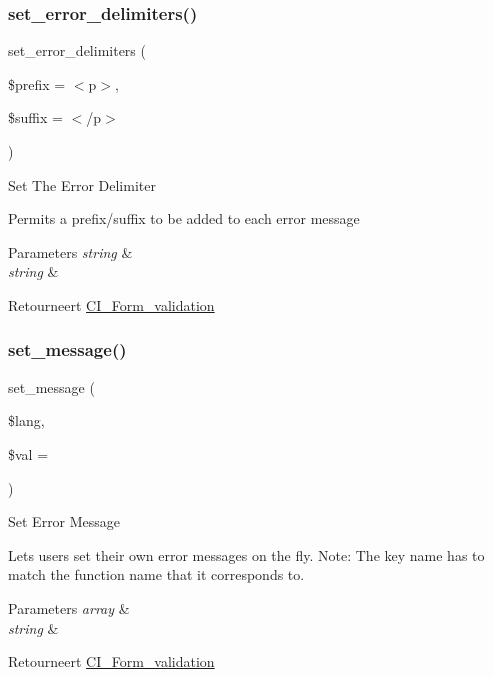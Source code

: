 \subsubsection{\texorpdfstring{set\_error\_delimiters()}{set\_error\_delimiters()}}
{\footnotesize\ttfamily set\+\_\+error\+\_\+delimiters (\begin{DoxyParamCaption}\item[{}]{\$prefix = {\ttfamily \textquotesingle{}$<$p$>$\textquotesingle{}},  }\item[{}]{\$suffix = {\ttfamily \textquotesingle{}$<$/p$>$\textquotesingle{}} }\end{DoxyParamCaption})}

Set The Error Delimiter

Permits a prefix/suffix to be added to each error message


\begin{DoxyParams}{Parameters}
{\em string} & \\
\hline
{\em string} & \\
\hline
\end{DoxyParams}
\begin{DoxyReturn}{Retourneert}
\mbox{\hyperlink{class_c_i___form__validation}{C\+I\+\_\+\+Form\+\_\+validation}} 
\end{DoxyReturn}
\mbox{\label{class_c_i___form__validation_a5a0dc4d3aef1f228155320a1d5275895}} 
\subsubsection{\texorpdfstring{set\_message()}{set\_message()}}
{\footnotesize\ttfamily set\+\_\+message (\begin{DoxyParamCaption}\item[{}]{\$lang,  }\item[{}]{\$val = {\ttfamily \textquotesingle{}\textquotesingle{}} }\end{DoxyParamCaption})}

Set Error Message

Lets users set their own error messages on the fly. Note\+: The key name has to match the function name that it corresponds to.


\begin{DoxyParams}{Parameters}
{\em array} & \\
\hline
{\em string} & \\
\hline
\end{DoxyParams}
\begin{DoxyReturn}{Retourneert}
\mbox{\hyperlink{class_c_i___form__validation}{C\+I\+\_\+\+Form\+\_\+validation}} 
\end{DoxyReturn}
\mbox{\label{class_c_i___form__validation_a9e66e3cdc5ceb81c054d48e1203613f2}} 
